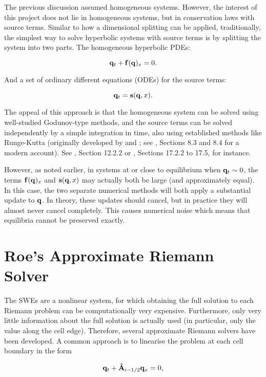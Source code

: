 The previous discussion assumed homogeneous systems. However, the interest of this project does not lie in homogeneous systems, but in conservation laws with source terms. Similar to how a dimensional splitting can be applied, traditionally, the simplest way to solve hyperbolic systems with source terms is by splitting the system into two parts. The homogeneous hyperbolic PDEs:

$$
  \vb q_t + \vb f(\vb q)_x = 0.
$$

And a set of ordinary different equations (ODEs) for the source terms:

$$
  \vb q_t = \vb s(\vb q, x).
$$

The appeal of this approach is that the homogeneous system can be solved using well-studied Godunov-type methods, and the source terms can be solved independently by a simple integration in time, also using established methods like Runge-Kutta (originally developed by \citet{runge1895numerische} and \citet{kutta1901beitrag}; see \citet{kaw2009numerical}, Sections 8.3 and 8.4 for a modern account). See \citet{toro2001shock}, Section 12.2.2 or \citet{leveque2002finite}, Sections 17.2.2 to 17.5, for instance.

However, as noted earlier, in systems at or close to equilibrium when $\vb q_t \sim 0$, the terms $\vb f(\vb q)_x$ and $\vb s(\vb q, x)$ may actually both be large (and approximately equal). In this case, the two separate numerical methods will both apply a substantial update to $\vb q$. In theory, these updates should cancel, but in practice they will almost never cancel completely. This causes numerical noise which means that equilibria cannot be preserved exactly.

\section{Roe's Approximate Riemann Solver}
\label{sec:roe}

The SWEs are a nonlinear system, for which obtaining the full solution to each Riemann problem can be computationally very expensive. Furthermore, only very little information about the full solution is actually used (in particular, only the value along the cell edge). Therefore, several approximate Riemann solvers have been developed. A common approach is to linearise the problem at each cell boundary in the form

\begin{align}
  \vb q_t + \vu A_{i-1/2} \vb q_x = 0,
\end{align}

